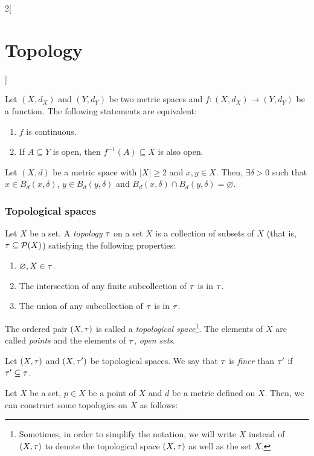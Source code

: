 \documentclass[../../../main.tex]{subfiles}
\begin{document}
\begin{multicols}{2}[\section{Topology}]
\begin{theorem}
    Let $(X,d_X)$ and $(Y,d_Y)$ be two metric spaces and $f:(X,d_X)\rightarrow(Y,d_Y)$ be a function. The following statements are equivalent:
    \begin{enumerate}
      \item $f$ is continuous.
      \item If $A\subseteq Y$ is open, then $f^{-1}(A)\subseteq X$ is also open.
    \end{enumerate}
  \end{theorem}
  \begin{prop}
    Let $(X,d)$ be a metric space with $|X|\geq 2$ and $x,y\in X$. Then, $\exists\delta>0$ such that $x\in B_d(x,\delta)$, $y\in B_d(y,\delta)$ and $B_d(x,\delta)\cap B_d(y,\delta)=\varnothing$.
  \end{prop}
  \subsubsection{Topological spaces}
  \begin{definition}
    Let $X$ be a set. A \emph{topology} $\tau$ on a set $X$ is a collection of subsets of $X$ (that is, $\tau\subseteq\mathcal{P}(X)$) satisfying the following properties:
    \begin{enumerate}
      \item $\varnothing, X\in\tau$.
      \item The intersection of any finite subcollection of $\tau$ is in $\tau$.
      \item The union of any subcollection of $\tau$ is in $\tau$.
    \end{enumerate}
    The ordered pair $(X,\tau)$ is called a \emph{topological space}\footnote{Sometimes, in order to simplify the notation, we will write $X$ instead of $(X,\tau)$ to denote the topological space $(X,\tau)$ as well as the set $X$.}. The elements of $X$ are called \emph{points} and the elements of $\tau$, \emph{open sets}.
  \end{definition}
  \begin{definition}
    Let $(X,\tau)$ and $(X,\tau')$ be topological spaces. We say that $\tau$ is \emph{finer} than $\tau'$ if $\tau'\subseteq\tau$.
  \end{definition}
  \begin{prop}
    Let $X$ be a set, $p\in X$ be a point of $X$ and $d$ be a metric defined on $X$. Then, we can construct some topologies on $X$ as follows:
    \begin{itemize}

\end{itemize}
\end{prop}
\end{multicols}
\end{document}

